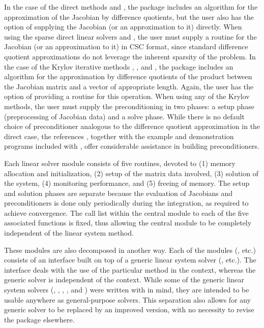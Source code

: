 In the case of the direct methods {\idadense} and {\idaband}, the
package includes an algorithm for the approximation of the Jacobian by
difference quotients, but the user also has the option of supplying
the Jacobian (or an approximation to it) directly.
When using the sparse direct linear solvers {\idaklu} and
{\idasuperlumt}, the user must supply a routine for the Jacobian (or an
approximation to it) in CSC format, since standard difference quotient
approximations do not leverage the inherent sparsity of the problem.
In the case of the Krylov iterative methods {\idaspgmr}, {\idaspbcg},
and {\idasptfqmr}, the package includes an algorithm for the
approximation by difference quotients of the product between the
Jacobian matrix and a vector of appropriate length. Again, the user
has the option of providing a routine for this operation.
When  using any of the Krylov
methods, the user must supply the preconditioning in two phases: 
a setup phase (preprocessing of Jacobian data) and a solve phase.
While there is no default
choice of preconditioner analogous to the difference quotient
approximation in the direct case, the references
\cite{BrHi:89, Byr:92}, together with
the example and demonstration programs included with {\ida}, offer
considerable assistance in building preconditioners.

Each {\ida} linear solver module consists of five routines, devoted to
(1) memory allocation and initialization, (2) setup of the matrix data
involved, (3) solution of the system, (4) monitoring performance,
and (5) freeing of memory.  
The setup and solution phases are separate because the evaluation of
Jacobians and preconditioners is done only periodically during the
integration, as required to achieve convergence. The call list within
the central {\ida} module to each of the five associated functions is
fixed, thus allowing the central module to be completely independent
of the linear system method.

These modules are also decomposed in another way.
Each of the modules ({\idadense}, etc.) consists of an interface built
on top of a generic linear system solver ({\dense}, etc.).  The
interface deals with the use of the particular method in the {\ida}
context, whereas the generic solver is independent of the context.
While some of the generic linear system solvers ({\dense}, {\band},
{\spgmr}, {\spbcg}, and {\sptfqmr}) were written with {\sundials} in
mind, they are intended to be usable anywhere as general-purpose
solvers.  This separation also allows for any generic solver to be
replaced by an improved version, with no necessity to revise the
{\ida} package elsewhere.

